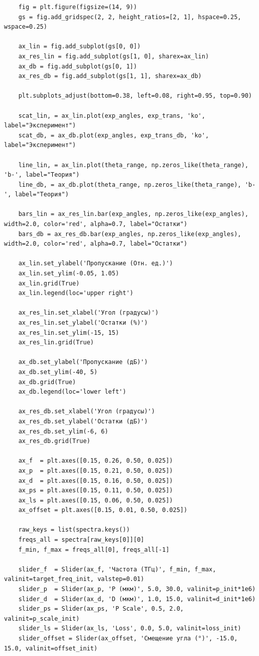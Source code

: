 \begin{verbatim}
    fig = plt.figure(figsize=(14, 9))
    gs = fig.add_gridspec(2, 2, height_ratios=[2, 1], hspace=0.25, wspace=0.25)
    
    ax_lin = fig.add_subplot(gs[0, 0])
    ax_res_lin = fig.add_subplot(gs[1, 0], sharex=ax_lin)
    ax_db = fig.add_subplot(gs[0, 1])
    ax_res_db = fig.add_subplot(gs[1, 1], sharex=ax_db)
    
    plt.subplots_adjust(bottom=0.38, left=0.08, right=0.95, top=0.90)
    
    scat_lin, = ax_lin.plot(exp_angles, exp_trans, 'ko', label="Эксперимент")
    scat_db, = ax_db.plot(exp_angles, exp_trans_db, 'ko', label="Эксперимент")
    
    line_lin, = ax_lin.plot(theta_range, np.zeros_like(theta_range), 'b-', label="Теория")
    line_db, = ax_db.plot(theta_range, np.zeros_like(theta_range), 'b-', label="Теория")
    
    bars_lin = ax_res_lin.bar(exp_angles, np.zeros_like(exp_angles), width=2.0, color='red', alpha=0.7, label="Остатки")
    bars_db = ax_res_db.bar(exp_angles, np.zeros_like(exp_angles), width=2.0, color='red', alpha=0.7, label="Остатки")
    
    ax_lin.set_ylabel('Пропускание (Отн. ед.)')
    ax_lin.set_ylim(-0.05, 1.05)
    ax_lin.grid(True)
    ax_lin.legend(loc='upper right')
    
    ax_res_lin.set_xlabel('Угол (градусы)')
    ax_res_lin.set_ylabel('Остатки (%)')
    ax_res_lin.set_ylim(-15, 15)
    ax_res_lin.grid(True)
    
    ax_db.set_ylabel('Пропускание (дБ)')
    ax_db.set_ylim(-40, 5)
    ax_db.grid(True)
    ax_db.legend(loc='lower left')
    
    ax_res_db.set_xlabel('Угол (градусы)')
    ax_res_db.set_ylabel('Остатки (дБ)')
    ax_res_db.set_ylim(-6, 6)
    ax_res_db.grid(True)
    
    ax_f  = plt.axes([0.15, 0.26, 0.50, 0.025])
    ax_p  = plt.axes([0.15, 0.21, 0.50, 0.025])
    ax_d  = plt.axes([0.15, 0.16, 0.50, 0.025])
    ax_ps = plt.axes([0.15, 0.11, 0.50, 0.025])
    ax_ls = plt.axes([0.15, 0.06, 0.50, 0.025])
    ax_offset = plt.axes([0.15, 0.01, 0.50, 0.025])
    
    raw_keys = list(spectra.keys())
    freqs_all = spectra[raw_keys[0]][0]
    f_min, f_max = freqs_all[0], freqs_all[-1]
    
    slider_f  = Slider(ax_f, 'Частота (ТГц)', f_min, f_max, valinit=target_freq_init, valstep=0.01)
    slider_p  = Slider(ax_p, 'P (мкм)', 5.0, 30.0, valinit=p_init*1e6)
    slider_d  = Slider(ax_d, 'D (мкм)', 1.0, 15.0, valinit=d_init*1e6)
    slider_ps = Slider(ax_ps, 'P Scale', 0.5, 2.0, valinit=p_scale_init)
    slider_ls = Slider(ax_ls, 'Loss', 0.0, 5.0, valinit=loss_init)
    slider_offset = Slider(ax_offset, 'Смещение угла (°)', -15.0, 15.0, valinit=offset_init)
    

\end{verbatim}

